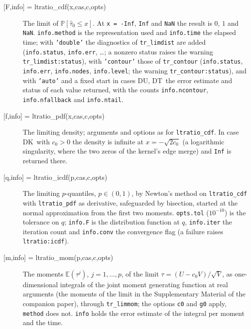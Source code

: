 \documentclass[11pt]{article}
\newcommand{\code}[1]{\texttt{#1}}
\newcommand{\E}{{\mathbb E}}
\newcommand{\PP}{{\mathbb P}}
\newcommand{\tauh}{\hat\tau}
\newcommand{\Fk}{\textsf{DK}}
\newcommand{\Fu}{\textsf{DU}}
\newcommand{\Ft}{\textsf{DT}}
\begin{document}
\begin{description}
\item[{[F,info] = ltratio\_cdf(x,cas,c,opts)}]
The limit of $\PP[\tauh_0\le x]$.  At \code{x = -Inf}, \code{Inf} and \code{NaN} the result is $0$, $1$ and \code{NaN}.  \code{info.method} is the representation used and \code{info.time} the elapsed time; with \code{'double'} the diagnostics of \code{tr\_limdist} are added (\code{info.status}, \code{info.err}, \ldots; a nonzero status raises the warning \code{tr\_limdist:status}), with \code{'contour'} those of \code{tr\_contour} (\code{info.status}, \code{info.err}, \code{info.nodes}, \code{info.level}; the warning \code{tr\_contour:status}), and with \code{'auto'} and a fixed start in cases \Fu, \Ft\ the error estimate and status of each value returned, with the counts \code{info.ncontour}, \code{info.nfallback} and \code{info.ntail}.
\item[{[f,info] = ltratio\_pdf(x,cas,c,opts)}]
The limiting density; arguments and options as for \code{ltratio\_cdf}.  In case \Fk\ with $c_0>0$ the density is infinite at $x=-\sqrt{2c_0}$ (a logarithmic singularity, where the two zeros of the kernel's edge merge) and \code{Inf} is returned there.
\item[{[q,info] = ltratio\_icdf(p,cas,c,opts)}]
The limiting $p$-quantiles, $p\in(0,1)$, by Newton's method on \code{ltratio\_cdf} with \code{ltratio\_pdf} as derivative, safeguarded by bisection, started at the normal approximation from the first two moments.  \code{opts.tol} ($10^{-10}$) is the tolerance on $q$; \code{info.F} is the distribution function at $q$, \code{info.iter} the iteration count and \code{info.conv} the convergence flag (a failure raises \code{ltratio:icdf}).
\item[{[m,info] = ltratio\_mom(p,cas,c,opts)}]
The moments $\E(\tau^j)$, $j=1,\ldots,p$, of the limit $\tau=(U-c_0V)/\sqrt V$, as one-dimensional integrals of the joint moment generating function at real arguments (the moments of the limit in the Supplementary Material of the companion paper), through \code{tr\_limmom}; the options \code{c0} and \code{g0} apply, \code{method} does not.  \code{info} holds the error estimate of the integral per moment and the time.
\end{description}
\end{document}
